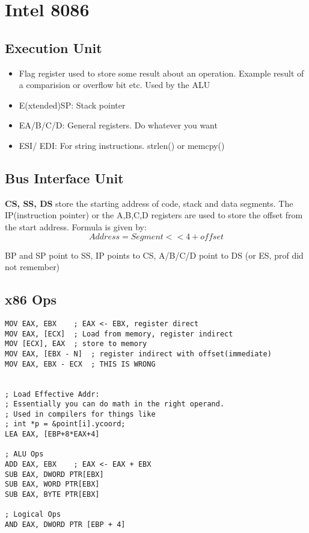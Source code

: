 \documentclass[11pt,letterpaper]{article}
\begin{document}
\maketitle
\thispagestyle{first}
\section*{Intel 8086}
\subsection*{Execution Unit}
\begin{itemize}
	\item Flag register used to store some result about an operation. Example
		result of a comparision or overflow bit etc. Used by the ALU
	\item E(xtended)SP: Stack pointer
	\item EA/B/C/D: General registers. Do whatever you want
	\item ESI/ EDI: For string instructions. strlen() or memcpy()
\end{itemize}

\subsection*{Bus Interface Unit}
\textbf{CS, SS, DS} store the starting address of code, stack and data segments.
The IP(instruction pointer) or the {A,B,C,D} registers are used to store the offset from the start address.
Formula is given by:  \[Address = Segment << 4 + offset\]

BP and SP point to SS, IP points to CS, A/B/C/D point to DS (or ES, prof did not remember)


\subsection*{x86 Ops}
\begin{verbatim}
MOV EAX, EBX	; EAX <- EBX, register direct
MOV EAX, [ECX]	; Load from memory, register indirect
MOV [ECX], EAX 	; store to memory
MOV EAX, [EBX - N]	; register indirect with offset(immediate)
MOV EAX, EBX - ECX 	; THIS IS WRONG


; Load Effective Addr:
; Essentially you can do math in the right operand.
; Used in compilers for things like
; int *p = &point[i].ycoord;
LEA EAX, [EBP+8*EAX+4]

; ALU Ops
ADD EAX, EBX	; EAX <- EAX + EBX
SUB EAX, DWORD PTR[EBX]
SUB EAX, WORD PTR[EBX]
SUB EAX, BYTE PTR[EBX]

; Logical Ops
AND EAX, DWORD PTR [EBP + 4]
\end{verbatim}
\end{document}
